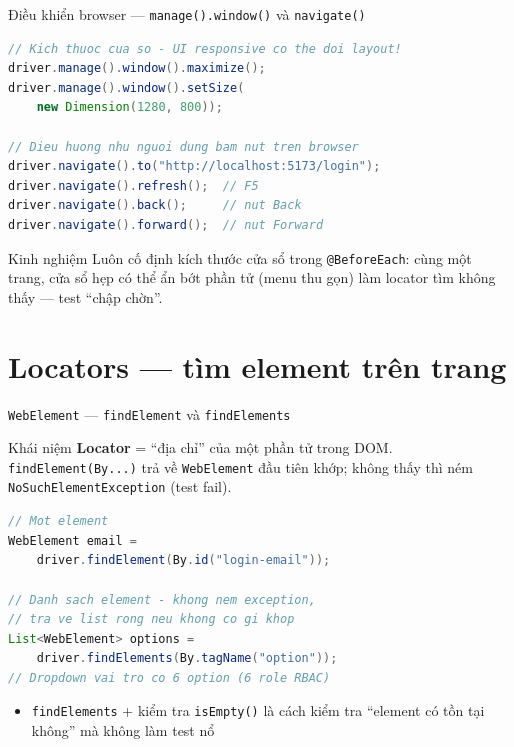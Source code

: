 \documentclass[aspectratio=169,12pt]{beamer}
\begin{document}
\begin{frame}[fragile]{Điều khiển browser --- \texttt{manage().window()} và \texttt{navigate()}}
\begin{lstlisting}[language=java,basicstyle=\ttfamily\scriptsize]
// Kich thuoc cua so - UI responsive co the doi layout!
driver.manage().window().maximize();
driver.manage().window().setSize(
    new Dimension(1280, 800));

// Dieu huong nhu nguoi dung bam nut tren browser
driver.navigate().to("http://localhost:5173/login");
driver.navigate().refresh();  // F5
driver.navigate().back();     // nut Back
driver.navigate().forward();  // nut Forward
\end{lstlisting}

  \begin{alertblock}{Kinh nghiệm}
    Luôn cố định kích thước cửa sổ trong \texttt{@BeforeEach}:
    cùng một trang, cửa sổ hẹp có thể ẩn bớt phần tử (menu thu gọn)
    làm locator tìm không thấy --- test ``chập chờn''.
  \end{alertblock}
\end{frame}

\section{Locators --- tìm element trên trang}

\begin{frame}[fragile]{\texttt{WebElement} --- \texttt{findElement} và \texttt{findElements}}
  \begin{block}{Khái niệm}
    \textbf{Locator} = ``địa chỉ'' của một phần tử trong DOM.
    \texttt{findElement(By...)} trả về \texttt{WebElement} đầu tiên khớp;
    không thấy thì ném \texttt{NoSuchElementException} (test fail).
  \end{block}

\begin{lstlisting}[language=java]
// Mot element
WebElement email =
    driver.findElement(By.id("login-email"));

// Danh sach element - khong nem exception,
// tra ve list rong neu khong co gi khop
List<WebElement> options =
    driver.findElements(By.tagName("option"));
// Dropdown vai tro co 6 option (6 role RBAC)
\end{lstlisting}

  \begin{itemize}
    \item \texttt{findElements} + kiểm tra \texttt{isEmpty()} là cách
          kiểm tra ``element có tồn tại không'' mà không làm test nổ
  \end{itemize}
\end{frame}
\end{document}
